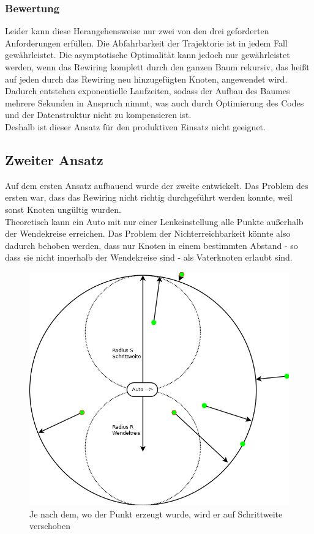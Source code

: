 \subsubsection{Bewertung}
Leider kann diese Herangehensweise nur zwei von den drei geforderten Anforderungen erfüllen. Die Abfahrbarkeit der Trajektorie ist in jedem Fall gewährleistet. Die asymptotische Optimalität kann jedoch nur gewährleistet werden, wenn das Rewiring komplett durch den ganzen Baum rekursiv, das heißt auf jeden durch das Rewiring neu hinzugefügten Knoten, angewendet wird. Dadurch entstehen exponentielle Laufzeiten, sodass der Aufbau des Baumes mehrere Sekunden in Anspruch nimmt, was auch durch Optimierung des Codes und der Datenstruktur nicht zu kompensieren ist.\\
Deshalb ist dieser Ansatz für den produktiven Einsatz nicht geeignet.

\subsection{Zweiter Ansatz}
Auf dem ersten Ansatz aufbauend wurde der zweite entwickelt. Das Problem des ersten war, dass das Rewiring nicht richtig durchgeführt werden konnte, weil sonst Knoten ungültig wurden. \\
Theoretisch kann ein Auto mit nur einer Lenkeinstellung alle Punkte außerhalb der Wendekreise erreichen. Das Problem der Nichterreichbarkeit könnte also dadurch behoben werden, dass nur Knoten in einem bestimmten Abstand - so dass sie nicht innerhalb der Wendekreise sind - als Vaterknoten erlaubt sind.\\
\begin{figure}
\centering
\label{fig:zweiteransatz}
\includegraphics[scale=0.5]{Bilder/Zweiter_Ansatz_Projektion.png} 
\caption{Je nach dem, wo der Punkt erzeugt wurde, wird er auf Schrittweite verschoben}
\end{figure}
